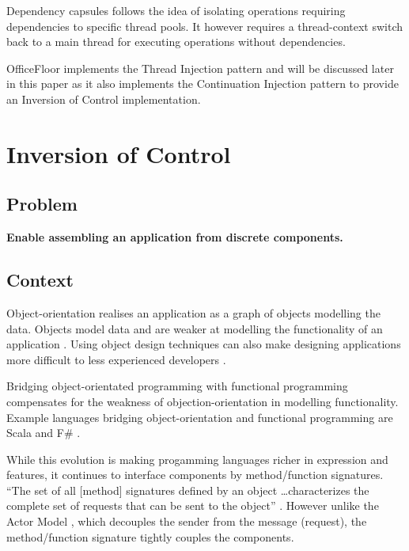 \documentclass[prodmode]{style/acmlarge}
\begin{document}
Dependency capsules \cite{dependency-capsules} follows the idea of isolating
operations requiring dependencies to specific thread pools.  It however requires
a thread-context switch back to a main thread for executing operations without
dependencies.

OfficeFloor \cite{officefloor} implements the Thread Injection pattern and will
be discussed later in this paper as it also implements the Continuation
Injection pattern to provide an Inversion of Control implementation.



\section{Inversion of Control}


\subsection{Problem}

\textbf{Enable assembling an application from discrete components.}


\subsection{Context}

Object-orientation realises an application as a graph of objects modelling the
data.  Objects model data and are weaker at modelling the functionality of an
application \cite{oo-behaviour}.  Using object design techniques can also make
designing applications more difficult to less experienced developers
\cite{oo-design}.

Bridging object-orientated programming with functional programming
\cite{bridging-function-oo} compensates for the weakness of
objection-orientation in modelling functionality.  Example languages bridging
object-orientation and functional programming are Scala \cite{scala} and F\#
\cite{f-sharp}.

While this evolution is making progamming languages richer in expression and
features, it continues to interface components by method/function signatures.
``The set of all [method] signatures defined by an object \ldots characterizes
the complete set of requests that can be sent to the object'' \cite[p. 13]{gof}.
 However unlike the Actor Model \cite{actors}, which decouples the sender from
the message (request), the method/function signature tightly couples the
components.
\end{document}
